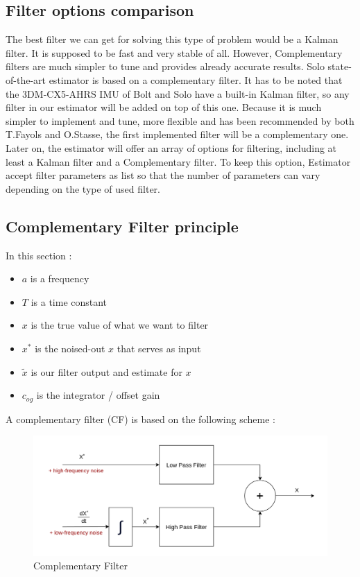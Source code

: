 \documentclass[a4paper,10pt]{article}
\begin{document}
\subsection{Filter options comparison}
The best filter we can get for solving this type of problem would be a Kalman filter. It is supposed to be fast and very stable of all. However, Complementary filters are much simpler to tune and provides already accurate results. Solo state-of-the-art estimator is based on a complementary filter. It has to be noted that the 3DM-CX5-AHRS IMU of Bolt and Solo have a built-in Kalman filter, so any filter in our estimator will be added on top of this one. Because it is much simpler to implement and tune, more flexible and has been recommended by both T.Fayols and O.Stasse, the first implemented filter will be a complementary one. Later on, the estimator will offer an array of options for filtering, including at least a Kalman filter and a Complementary filter. To keep this option, Estimator accept filter parameters as list so that the number of parameters can vary depending on the type of used filter.

\subsection{Complementary Filter principle}
\label{complementary filter principle}
In this section :
\begin{itemize}[noitemsep,topsep=0.5pt,parsep=0.1pt,partopsep=0.1pt]
\item $a$ is a frequency
\item $T$ is a time constant
\item $x$ is the true value of what we want to filter
\item $x^*$ is the noised-out $x$ that serves as input
\item $\widetilde{x}$ is our filter output and estimate for $x$
\item $c_{og}$ is the integrator / offset gain

\end{itemize}
A complementary filter (CF) is based on the following scheme \cite{13}:
\begin{figure}[H]
\centering
  \includegraphics[width=\linewidth, angle=0, scale=0.8]{./images/CF*.png}
  \caption{Complementary Filter}
\end{figure}
\end{document}
